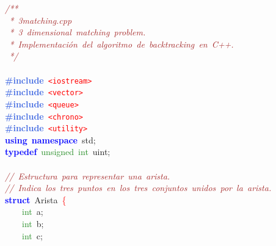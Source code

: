 \noindent
\mbox{}\textit{\textcolor{Brown}{/**}} \\
\mbox{}\textit{\textcolor{Brown}{\ *\ 3matching.cpp}} \\
\mbox{}\textit{\textcolor{Brown}{\ *\ 3\ dimensional\ matching\ problem.}} \\
\mbox{}\textit{\textcolor{Brown}{\ *\ Implementación\ del\ algoritmo\ de\ backtracking\ en\ C++.}} \\
\mbox{}\textit{\textcolor{Brown}{\ */}} \\
\mbox{} \\
\mbox{}\textbf{\textcolor{RoyalBlue}{\#include}}\ \texttt{\textcolor{Red}{\textless{}iostream\textgreater{}}} \\
\mbox{}\textbf{\textcolor{RoyalBlue}{\#include}}\ \texttt{\textcolor{Red}{\textless{}vector\textgreater{}}} \\
\mbox{}\textbf{\textcolor{RoyalBlue}{\#include}}\ \texttt{\textcolor{Red}{\textless{}queue\textgreater{}}} \\
\mbox{}\textbf{\textcolor{RoyalBlue}{\#include}}\ \texttt{\textcolor{Red}{\textless{}chrono\textgreater{}}} \\
\mbox{}\textbf{\textcolor{RoyalBlue}{\#include}}\ \texttt{\textcolor{Red}{\textless{}utility\textgreater{}}} \\
\mbox{}\textbf{\textcolor{Blue}{using}}\ \textbf{\textcolor{Blue}{namespace}}\ std\textcolor{BrickRed}{;} \\
\mbox{}\textbf{\textcolor{Blue}{typedef}}\ \textcolor{ForestGreen}{unsigned}\ \textcolor{ForestGreen}{int}\ uint\textcolor{BrickRed}{;} \\
\mbox{} \\
\mbox{}\textit{\textcolor{Brown}{//\ Estructura\ para\ representar\ una\ arista.}} \\
\mbox{}\textit{\textcolor{Brown}{//\ Indica\ los\ tres\ puntos\ en\ los\ tres\ conjuntos\ unidos\ por\ la\ arista.}} \\
\mbox{}\textbf{\textcolor{Blue}{struct}}\ \textcolor{TealBlue}{Arista}\ \textcolor{Red}{\{} \\
\mbox{}\ \ \ \ \textcolor{ForestGreen}{int}\ a\textcolor{BrickRed}{;} \\
\mbox{}\ \ \ \ \textcolor{ForestGreen}{int}\ b\textcolor{BrickRed}{;} \\
\mbox{}\ \ \ \ \textcolor{ForestGreen}{int}\ c\textcolor{BrickRed}{;} \\
\mbox{} \\
